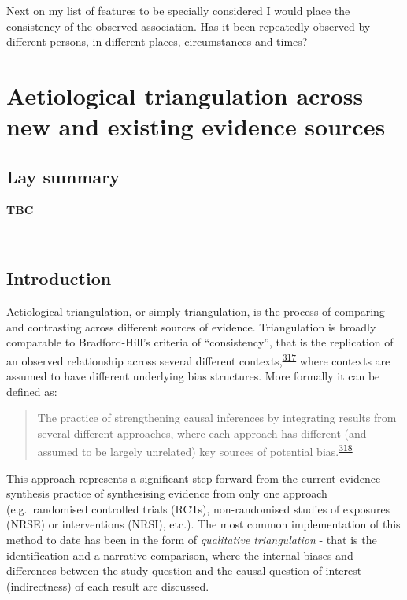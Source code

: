 \documentclass[a4paper, twoside]{templates/ociamthesis}
\begin{document}
\begin{savequote}
Next on my list of features to be specially considered I would place the
consistency of the observed association. Has it been repeatedly observed
by different persons, in different places, circumstances and times?
\end{savequote}



\hypertarget{tri-heading}{%
\chapter{Aetiological triangulation across new and existing evidence sources}\label{tri-heading}}

\minitoc 

\hypertarget{lay-summary-5}{%
\section{Lay summary}\label{lay-summary-5}}

\textbf{TBC}

~

\newpage

\newpage

\hypertarget{triangulation-overview}{%
\section{Introduction}\label{triangulation-overview}}

Aetiological triangulation, or simply triangulation, is the process of comparing and contrasting across different sources of evidence. Triangulation is broadly comparable to Bradford-Hill's criteria of ``consistency'', that is the replication of an observed relationship across several different contexts,\textsuperscript{\protect\hyperlink{ref-hill1965}{317}} where contexts are assumed to have different underlying bias structures. More formally it can be defined as:

\begin{quote}
The practice of strengthening causal inferences by integrating results from several different approaches, where each approach has different (and assumed to be largely unrelated) key sources of potential bias.\textsuperscript{\protect\hyperlink{ref-lawlor2016}{318}}
\end{quote}

This approach represents a significant step forward from the current evidence synthesis practice of synthesising evidence from only one approach (e.g.~randomised controlled trials (RCTs), non-randomised studies of exposures (NRSE) or interventions (NRSI), etc.). The most common implementation of this method to date has been in the form of \emph{qualitative triangulation} - that is the identification and a narrative comparison, where the internal biases and differences between the study question and the causal question of interest (indirectness) of each result are discussed.
\end{document}
